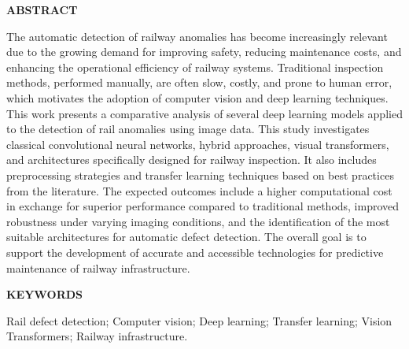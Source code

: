 \newpage
\thispagestyle{empty}
\begin{center}
    \textbf{ABSTRACT}
\end{center}
The automatic detection of railway anomalies has become increasingly relevant due to the growing demand for improving safety, reducing maintenance costs, and enhancing the operational efficiency of railway systems. Traditional inspection methods, performed manually, are often slow, costly, and prone to human error, which motivates the adoption of computer vision and deep learning techniques. This work presents a comparative analysis of several deep learning models applied to the detection of rail anomalies using image data. This study investigates classical convolutional neural networks, hybrid approaches, visual transformers, and architectures specifically designed for railway inspection. It also includes preprocessing strategies and transfer learning techniques based on best practices from the literature. The expected outcomes include a higher computational cost in exchange for superior performance compared to traditional methods, improved robustness under varying imaging conditions, and the identification of the most suitable architectures for automatic defect detection. The overall goal is to support the development of accurate and accessible technologies for predictive maintenance of railway infrastructure.
\begin{center}
    \textbf{KEYWORDS}
\end{center}
Rail defect detection; Computer vision; Deep learning; Transfer learning; Vision Transformers; Railway infrastructure.
